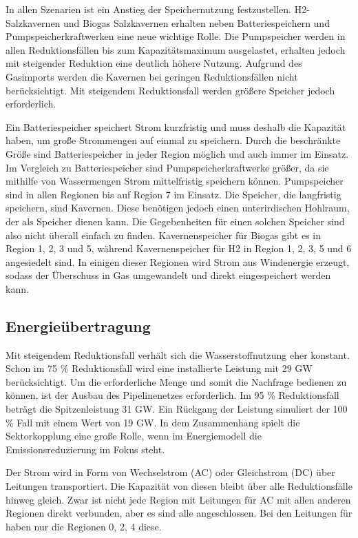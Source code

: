 In allen Szenarien ist ein Anstieg der Speichernutzung festzustellen. H2-Salzkavernen und Biogas Salzkavernen erhalten neben Batteriespeichern und Pumpspeicherkraftwerken eine neue wichtige Rolle. Die Pumpspeicher werden in allen Reduktionsfällen bis zum Kapazitätsmaximum ausgelastet, erhalten jedoch mit steigender Reduktion eine deutlich höhere Nutzung. 
Aufgrund des Gasimports werden die Kavernen bei geringen Reduktionsfällen nicht berücksichtigt. Mit steigendem Reduktionsfall werden größere Speicher jedoch erforderlich.

Ein Batteriespeicher speichert Strom kurzfristig und muss deshalb die Kapazität haben, um große Strommengen auf einmal zu speichern. Durch die beschränkte Größe sind Batteriespeicher in jeder Region möglich und auch immer im Einsatz.
Im Vergleich zu Batteriespeicher sind Pumpspeicherkraftwerke größer, da sie mithilfe von Wassermengen Strom mittelfristig speichern können. Pumpspeicher sind in allen Regionen bis auf Region 7 im Einsatz.
Die Speicher, die langfristig speichern, sind Kavernen. Diese benötigen jedoch einen unterirdischen Hohlraum, der als Speicher dienen kann. Die Gegebenheiten für einen solchen Speicher sind also nicht überall einfach zu finden. Kavernenspeicher für Biogas gibt es in Region 1, 2, 3 und 5, während Kavernenspeicher für H2 in Region 1, 2, 3, 5 und 6 angesiedelt sind. In einigen dieser Regionen wird Strom aus Windenergie erzeugt, sodass der Überschuss in Gas umgewandelt und direkt eingespeichert werden kann.


\subsection{Energieübertragung}
Mit steigendem Reduktionsfall verhält sich die Wasserstoffnutzung eher konstant. Schon im 75 \% Reduktionsfall wird eine installierte Leistung mit 29 GW berücksichtigt. Um die erforderliche Menge und somit die Nachfrage bedienen zu können, ist der Ausbau des Pipelinenetzes erforderlich. Im 95 \% Reduktionsfall beträgt die Spitzenleistung 31 GW. Ein Rückgang der Leistung simuliert der 100 \% Fall mit einem Wert von 19 GW. In dem Zusammenhang spielt die Sektorkopplung eine große Rolle, wenn im Energiemodell die Emissionsreduzierung im Fokus steht. 

Der Strom wird in Form von Wechselstrom (AC) oder Gleichstrom (DC) über Leitungen transportiert. Die Kapazität von diesen bleibt über alle Reduktionsfälle hinweg gleich. Zwar ist nicht jede Region mit Leitungen für AC mit allen anderen Regionen direkt verbunden, aber es sind alle angeschlossen. Bei den Leitungen für haben nur die Regionen 0, 2, 4 diese.

